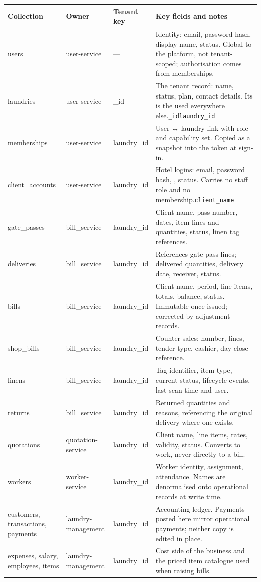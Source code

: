 \documentclass[11pt,a4paper,oneside]{book}
\begin{document}
\begin{center}\small
\begin{tabularx}{\linewidth}{|X|X|X|X|}
\hline
\rowcolor{lightgrey}
\textbf{Collection} & \textbf{Owner} & \textbf{Tenant key} & \textbf{Key fields and notes} \\ \hline
users & user-service & — & Identity: email, password hash, display name, status. Global to the platform, not tenant-scoped; authorisation comes from memberships. \\ \hline
laundries & user-service & \_id & The tenant record: name, status, plan, contact details. Its  is the  used everywhere else.\texttt{\_id}\texttt{laundry\_id} \\ \hline
memberships & user-service & laundry\_id & User ↔ laundry link with role and capability set. Copied as a snapshot into the token at sign-in. \\ \hline
client\_accounts & user-service & laundry\_id & Hotel logins: email, password hash, , status. Carries no staff role and no membership.\texttt{client\_name} \\ \hline
gate\_passes & bill\_service & laundry\_id & Client name, pass number, dates, item lines and quantities, status, linen tag references. \\ \hline
deliveries & bill\_service & laundry\_id & References gate pass lines; delivered quantities, delivery date, receiver, status. \\ \hline
bills & bill\_service & laundry\_id & Client name, period, line items, totals, balance, status. Immutable once issued; corrected by adjustment records. \\ \hline
shop\_bills & bill\_service & laundry\_id & Counter sales: number, lines, tender type, cashier, day-close reference. \\ \hline
linens & bill\_service & laundry\_id & Tag identifier, item type, current status, lifecycle events, last scan time and user. \\ \hline
returns & bill\_service & laundry\_id & Returned quantities and reasons, referencing the original delivery where one exists. \\ \hline
quotations & quotation-service & laundry\_id & Client name, line items, rates, validity, status. Converts to work, never directly to a bill. \\ \hline
workers & worker-service & laundry\_id & Worker identity, assignment, attendance. Names are denormalised onto operational records at write time. \\ \hline
customers, transactions, payments & laundry-management & laundry\_id & Accounting ledger. Payments posted here mirror operational payments; neither copy is edited in place. \\ \hline
expenses, salary, employees, items & laundry-management & laundry\_id & Cost side of the business and the priced item catalogue used when raising bills. \\ \hline
\end{tabularx}
\end{center}
\end{document}
